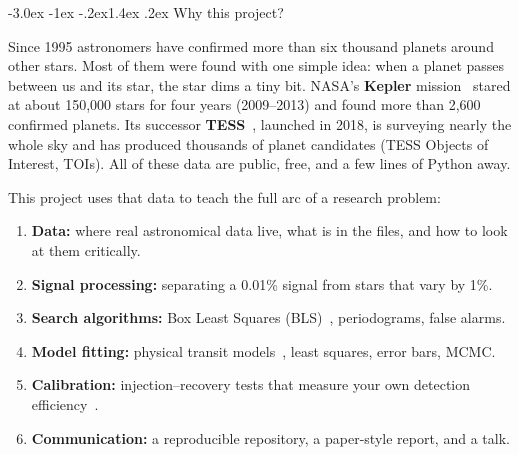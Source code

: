 \documentclass[11pt,a4paper]{article}
\makeatletter
\renewcommand\section{\@startsection{section}{1}{\z@}%
  {-3.0ex \@plus -1ex \@minus -.2ex}{1.4ex \@plus .2ex}%
  {\normalfont\sffamily\LARGE\bfseries\color{navy}}}
\makeatother
\begin{document}
\newpage
\tableofcontents
\newpage
{}

\section{Why this project?}
\label{sec:why}

Since 1995 astronomers have confirmed more than six thousand planets around other stars. Most of them were
found with one simple idea: when a planet passes between us and its star, the star dims a tiny bit. NASA's
\textbf{Kepler} mission~\citep{Borucki2010} stared at about 150{,}000 stars for four years (2009--2013) and
found more than 2{,}600 confirmed planets. Its successor \textbf{TESS}~\citep{Ricker2015}, launched in 2018,
is surveying nearly the whole sky and has produced thousands of planet candidates (TESS Objects of
Interest, TOIs). All of these data are public, free, and a few lines of Python away.

This project uses that data to teach the full arc of a research problem:
\begin{enumerate}
  \item \textbf{Data:} where real astronomical data live, what is in the files, and how to look at them critically.
  \item \textbf{Signal processing:} separating a 0.01\% signal from stars that vary by 1\%.
  \item \textbf{Search algorithms:} Box Least Squares (BLS)~\citep{Kovacs2002}, periodograms, false alarms.
  \item \textbf{Model fitting:} physical transit models~\citep{MandelAgol2002,Kreidberg2015}, least squares, error bars, MCMC.
  \item \textbf{Calibration:} injection--recovery tests that measure your own detection efficiency~\citep{Christiansen2013,Christiansen2020}.
  \item \textbf{Communication:} a reproducible repository, a paper-style report, and a talk.
\end{enumerate}
\end{document}

